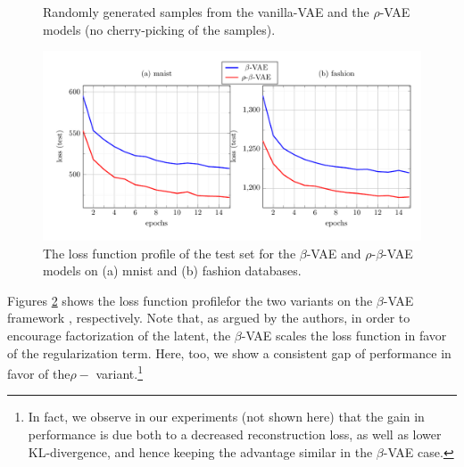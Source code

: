 \documentclass{article}
\begin{document}
\begin{figure}  [!h]
\begin{center}
\end{center}
\vspace{-0.4cm}    
   \caption{Randomly generated samples from the vanilla-VAE and the $\rho$-VAE models (no cherry-picking of the samples).}
   \label{fig:pic_VanillaVAE}
   \end{figure}



 \begin{figure}  [!h]
   \begin{center} 
\includegraphics[width=1.0\textwidth]{figs/curves/BETA_VAE.pdf}
\end{center}
\vspace{-.75cm}     
   \caption{The loss function profile of the test set for the $\beta$-VAE and $\rho$-$\beta$-VAE models on (a) mnist and (b) fashion databases.}
   \label{fig:curve_BETAVAE}
   \end{figure}

Figures \ref{fig:curve_BETAVAE} shows the loss function profilefor the two variants on the $\beta$-VAE framework \cite{higgins2017beta}, respectively. Note that, as argued by the authors, in order to encourage factorization of the latent, the $\beta$-VAE scales the loss function in favor of the regularization term. Here, too, we show a consistent gap of performance in favor of the$\rho-$ variant.\footnote{In fact, we observe in our experiments (not shown here) that the gain in performance is due both to a decreased reconstruction loss, as well as lower KL-divergence, and hence keeping the advantage similar in the $\beta$-VAE case.}
\end{document}
